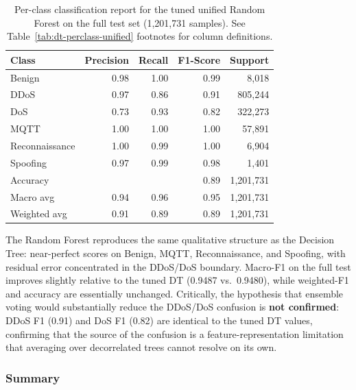 \begin{table}[H]
\centering
\caption{Per-class classification report for the tuned unified Random Forest on the full test set (1,201,731 samples). See Table~\ref{tab:dt-perclass-unified} footnotes for column definitions.}
\label{tab:rf-perclass-unified}
\small
\begin{tabular}{@{}l r r r r@{}}
\toprule
\textbf{Class} & \textbf{Precision} & \textbf{Recall} & \textbf{F1-Score} & \textbf{Support} \\
\midrule
Benign          & 0.98 & 1.00 & 0.99 &     8,018 \\
DDoS            & 0.97 & 0.86 & 0.91 &   805,244 \\
DoS             & 0.73 & 0.93 & 0.82 &   322,273 \\
MQTT            & 1.00 & 1.00 & 1.00 &    57,891 \\
Reconnaissance  & 1.00 & 0.99 & 1.00 &     6,904 \\
Spoofing        & 0.97 & 0.99 & 0.98 &     1,401 \\
\midrule
Accuracy        &      &      & 0.89 & 1,201,731 \\
Macro avg       & 0.94 & 0.96 & 0.95 & 1,201,731 \\
Weighted avg    & 0.91 & 0.89 & 0.89 & 1,201,731 \\
\bottomrule
\end{tabular}
\end{table}

The Random Forest reproduces the same qualitative structure as the Decision Tree: near-perfect scores on Benign, MQTT, Reconnaissance, and Spoofing, with residual error concentrated in the DDoS/DoS boundary. Macro-F1 on the full test improves slightly relative to the tuned DT (0.9487 vs.\ 0.9480), while weighted-F1 and accuracy are essentially unchanged. Critically, the hypothesis that ensemble voting would substantially reduce the DDoS/DoS confusion is \textbf{not confirmed}: DDoS F1 (0.91) and DoS F1 (0.82) are identical to the tuned DT values, confirming that the source of the confusion is a feature-representation limitation that averaging over decorrelated trees cannot resolve on its own.

\subsubsection{Summary}

